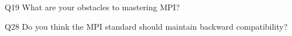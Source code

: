 \begin{description}%
\item{Q19} What are your obstacles to mastering MPI?%
\item{Q28} Do you think the MPI standard should maintain backward compatibility?%
\end{description}%
